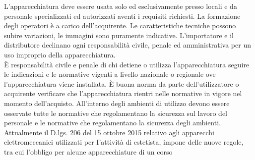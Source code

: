 \documentclass[a4paper]{article}
\begin{document}
L'apparecchiatura deve essere usata solo ed esclusivamente presso locali e da personale specializzati ed autorizzati aventi i requisiti richiesti. La formazione degli operatori è a carico dell'acquirente. Le caratteristiche tecniche possono subire variazioni, le immagini sono puramente indicative. L'importatore e il distributore declinano ogni responsabilità civile, penale ed amministrativa per un uso improprio della apparecchiatura.\\
È responsabilità civile e penale di chi detiene o utilizza l'apparecchiatura seguire le indicazioni e le normative vigenti a livello nazionale o regionale ove l'apparecchiatura viene installata. È buona norma da parte dell'utilizzatore o acquirente verificare che l'apparecchiatura rientri nelle normative in vigore nel momento dell'acquisto. All'interno degli ambienti di utilizzo devono essere osservate tutte le normative che regolamentano la sicurezza sul lavoro del personale e le normative che regolamentano la sicurezza degli ambienti.\\
Attualmente il D.lgs. 206 del 15 ottobre 2015 relativo agli apparecchi elettromeccanici utilizzati per I'attività di estetista, impone delle nuove regole, tra cui l'obbligo per alcune apparecchiature di un corso %




\end{document}
